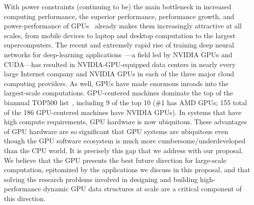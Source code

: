 
With power constraints (continuing to be) the main bottleneck in increased computing performance, the superior performance, performance growth, and power-performance of GPUs~\cite{Dally:2010:GCT,Dally:2021:EOT} already makes them increasingly attractive at all scales, from mobile devices to laptop and desktop computation to the largest supercomputers. The recent and extremely rapid rise of training deep neural networks for deep-learning applications~\cite{Amodei:2015:DS2,Chetlur:2014:CEP,Coates:2013:DLW,Hannun:2014:DSU}---a field led by NVIDIA GPUs and CUDA---has resulted in NVIDIA-GPU-equipped data centers in nearly every large Internet company and NVIDIA GPUs in each of the three major cloud computing providers. As well, GPUs have made enormous inroads into the largest-scale computations. GPU-centered machines dominate the top of the biannual TOP500 list~\cite{top500:jun2024}, including 9 of the top 10 (\#1 has AMD GPUs; 155 total of the 186 GPU-centered machines have NVIDIA GPUs). In systems that have high compute requirements, GPU hardware is now ubiquitous. 
%
%
These advantages of GPU hardware are so significant that GPU systems are ubiquitous even though the GPU software ecosystem is much more cumbersome/underdeveloped than the CPU world. It is precisely this gap that we address with our proposal. We believe that the GPU presents the best future direction for large-scale computation, epitomized by the applications we discuss in this proposal, and that solving the research problems involved in designing and building high-performance dynamic GPU data structures at scale are a critical component of this direction.


